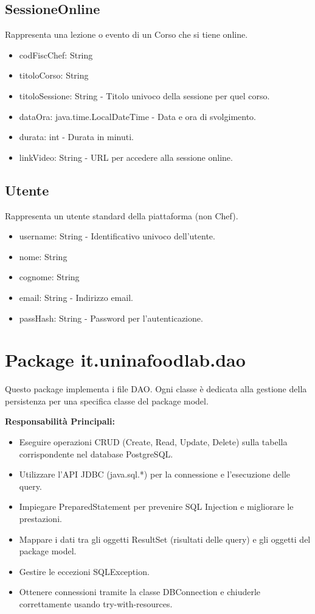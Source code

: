 \documentclass[a4paper, 12pt]{article}
\begin{document}
\subsection{SessioneOnline}
Rappresenta una lezione o evento di un Corso che si tiene online.
\begin{itemize}
    \item codFiscChef: String
    \item titoloCorso: String
    \item titoloSessione: String - Titolo univoco della sessione per quel corso.
    \item dataOra: java.time.LocalDateTime - Data e ora di svolgimento.
    \item durata: int - Durata in minuti.
    \item linkVideo: String - URL per accedere alla sessione online.
\end{itemize}

\subsection{Utente}
Rappresenta un utente standard della piattaforma (non Chef).
\begin{itemize}
    \item username: String - Identificativo univoco dell'utente.
    \item nome: String
    \item cognome: String
    \item email: String - Indirizzo email.
    \item passHash: String - Password per l'autenticazione.
\end{itemize}

\section{Package it.uninafoodlab.dao}
Questo package implementa i file DAO. Ogni classe è dedicata alla gestione della persistenza per una specifica classe del package model.

\textbf{Responsabilità Principali:}
\begin{itemize}
    \item Eseguire operazioni CRUD (Create, Read, Update, Delete) sulla tabella corrispondente nel database PostgreSQL.
    \item Utilizzare l'API JDBC (java.sql.*) per la connessione e l'esecuzione delle query.
    \item Impiegare PreparedStatement per prevenire SQL Injection e migliorare le prestazioni.
    \item Mappare i dati tra gli oggetti ResultSet (risultati delle query) e gli oggetti del package model.
    \item Gestire le eccezioni SQLException.
    \item Ottenere connessioni tramite la classe DBConnection e chiuderle correttamente usando try-with-resources.
\end{itemize}
\end{document}
